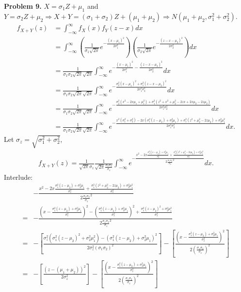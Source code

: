 \documentclass{article}
\begin{document}
\textbf{Problem 9.}
$X=\sigma_1Z+\mu_1$ and $Y=\sigma_2Z+\mu_2\Rightarrow X+Y=(\sigma_1+\sigma_2)Z+(\mu_1+\mu_2)\Rightarrow N(\mu_1+\mu_2,\sigma_1^2+\sigma_2^2)$.
\begin{align}
    f_{X+Y}(z) & = \int_{-\infty}^{\infty}f_X(x)f_Y(z-x)dx \\
    & = \int_{-\infty}^{\infty}\left(\frac{1}{\sigma_1\sqrt{2\pi}}e^{-\frac{(x-\mu_1)^2}{2\sigma_1^2}}\right)\left(\frac{1}{\sigma_2\sqrt{2\pi}}e^{-\frac{(z-x-\mu_2)^2}{2\sigma_2^2}}\right)dx \\
    & = \frac{1}{\sigma_1\sigma_2\sqrt{2\pi}\sqrt{2\pi}}\int_{-\infty}^{\infty}e^{-\frac{(x-\mu_1)^2}{2\sigma_1^2}-\frac{(z-x-\mu_2)^2}{2\sigma_2^2}}dx \\
    & = \frac{1}{\sigma_1\sigma_2\sqrt{2\pi}\sqrt{2\pi}}\int_{-\infty}^{\infty}e^{-\frac{\sigma_2^2(x-\mu_1)^2+\sigma_1^2(z-x-\mu_2)^2}{2\sigma_1^2\sigma_2^2}}dx \\
    & = \frac{1}{\sigma_1\sigma_2\sqrt{2\pi}\sqrt{2\pi}}\int_{-\infty}^{\infty}e^{-\frac{\sigma_2^2(x^2-2x\mu_1+\mu_1^2)+\sigma_1^2(z^2+x^2+\mu_2^2-2zx+2x\mu_2-2z\mu_2)}{2\sigma_1^2\sigma_2^2}}dx \\
    & = \frac{1}{\sigma_1\sigma_2\sqrt{2\pi}\sqrt{2\pi}}\int_{-\infty}^{\infty}e^{-\frac{x^2(\sigma_1^2+\sigma_2^2)-2x(\sigma_1^2(z-\mu_2)+\sigma_2^2\mu_1)+\sigma_1^2(z^2+\mu_2^2-2z\mu_2)+\sigma_2^2\mu_1^2}{2\sigma_1^2\sigma_2^2}}dx.
\end{align}
Let $\sigma_z=\sqrt{\sigma_1^2+\sigma_2^2}$,
\begin{align}
    f_{X+Y}(z)=\frac{1}{\sqrt{2\pi}\sigma_z}\frac{1}{\sqrt{2\pi}\frac{\sigma_1\sigma_2}{\sigma_z}}\int_{-\infty}^{\infty}e^{-\frac{x^2-2x\frac{\sigma_1^2(z-\mu_2)+\sigma_2^2\mu_1}{\sigma_z^2}+\frac{\sigma_1^2(z^2+\mu_2^2-2z\mu_2)+\sigma_2^2\mu_1^2}{\sigma_z^2}}{2\frac{\sigma_1\sigma_2}{\sigma_z}^2}}dx.
\end{align}
Interlude: 
\begin{align}
    & -\frac{x^2-2x\frac{\sigma_1^2(z-\mu_2)+\sigma_2^2\mu_1}{\sigma_z^2}+\frac{\sigma_1^2(z^2+\mu_2^2-2z\mu_2)+\sigma_2^2\mu_1^2}{\sigma_z^2}}{2\frac{\sigma_1\sigma_2}{\sigma_z}^2} \\
    = & -\frac{\left(x-\frac{\sigma_1^2(z-\mu_2)+\sigma_2^2\mu_1}{\sigma_z^2}\right)^2-\left(\frac{\sigma_1^2(z-\mu_2)+\sigma_2^2\mu_1}{\sigma_z^2}\right)^2+\frac{\sigma_1^2(z-\mu_2)^2+\sigma_2^2\mu_1^2}{\sigma_z^2}}{2\frac{\sigma_1\sigma_2}{\sigma_z}^2} \\
    = & -\left[\frac{\sigma_z^2(\sigma_1^2(z-\mu_2)^2+\sigma_2^2\mu_1^2)-(\sigma_1^2(z-\mu_2)+\sigma_2^2\mu_1)^2}{2\sigma_z^2(\sigma_1\sigma_2)^2}\right]-\left[\frac{\left(x-\frac{\sigma_1^2(z-\mu_2)+\sigma_2^2\mu_1}{\sigma_z^2}\right)^2}{2\left(\frac{\sigma_1\sigma_2}{\sigma_z}\right)^2}\right] \\
    = & -\left[\frac{(z-(\mu_1+\mu_2))^2}{2\sigma_z^2}\right]-\left[\frac{\left(x-\frac{\sigma_1^2(z-\mu_2)+\sigma_2^2\mu_1}{\sigma_z^2}\right)^2}{2\left(\frac{\sigma_1\sigma_2}{\sigma_z}\right)^2}\right]
\end{align}
\end{document}

